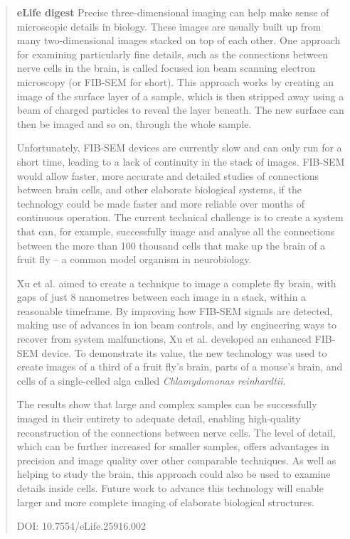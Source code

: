 \documentclass{article}
\begin{document}
\begin{quote}
\noindent\textbf{eLife digest} Precise three-dimensional imaging can help make sense of microscopic details in biology. These images are usually built up from many two-dimensional images stacked on top of each other. One approach for examining particularly fine details, such as the connections between nerve cells in the brain, is called focused ion beam scanning electron microscopy (or FIB-SEM for short). This approach works by creating an image of the surface layer of a sample, which is then stripped away using a beam of charged particles to reveal the layer beneath. The new surface can then be imaged and so on, through the whole sample.

Unfortunately, FIB-SEM devices are currently slow and can only run for a short time, leading to a lack of continuity in the stack of images. FIB-SEM would allow faster, more accurate and detailed studies of connections between brain cells, and other elaborate biological systems, if the technology could be made faster and more reliable over months of continuous operation. The current technical challenge is to create a system that can, for example, successfully image and analyse all the connections between the more than 100 thousand cells that make up the brain of a fruit fly – a common model organism in neurobiology.

Xu et al. aimed to create a technique to image a complete fly brain, with gaps of just 8 nanometres between each image in a stack, within a reasonable timeframe. By improving how FIB-SEM signals are detected, making use of advances in ion beam controls, and by engineering ways to recover from system malfunctions, Xu et al. developed an enhanced FIB-SEM device. To demonstrate its value, the new technology was used to create images of a third of a fruit fly’s brain, parts of a mouse’s brain, and cells of a single-celled alga called \emph{Chlamydomonas reinhardtii}.

The results show that large and complex samples can be successfully imaged in their entirety to adequate detail, enabling high-quality reconstruction of the connections between nerve cells. The level of detail, which can be further increased for smaller samples, offers advantages in precision and image quality over other comparable techniques. As well as helping to study the brain, this approach could also be used to examine details inside cells. Future work to advance this technology will enable larger and more complete imaging of elaborate biological structures.

\noindent DOI: 10.7554/eLife.25916.002
\end{quote}
\end{document}
